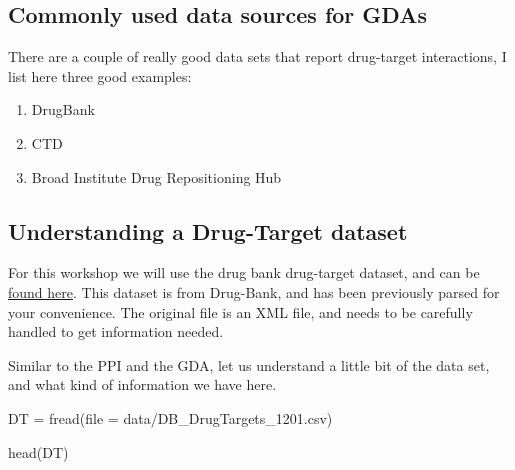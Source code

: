 \documentclass[
]{book}
\newenvironment{Shaded}{\begin{snugshade}}{\end{snugshade}}
\newcommand{\AttributeTok}[1]{\textcolor[rgb]{0.77,0.63,0.00}{#1}}
\newcommand{\FunctionTok}[1]{\textcolor[rgb]{0.00,0.00,0.00}{#1}}
\newcommand{\NormalTok}[1]{#1}
\newcommand{\OtherTok}[1]{\textcolor[rgb]{0.56,0.35,0.01}{#1}}
\newcommand{\StringTok}[1]{\textcolor[rgb]{0.31,0.60,0.02}{#1}}
\begin{document}
\hypertarget{commonly-used-data-sources-for-gdas-1}{%
\subsection{Commonly used data sources for GDAs}\label{commonly-used-data-sources-for-gdas-1}}

There are a couple of really good data sets that report drug-target interactions, I list here three good examples:

\begin{enumerate}
\def\labelenumi{\arabic{enumi}.}
\item
  DrugBank \citep{Wishart2006, wishart2017}
\item
  CTD \citep{davis2020}
\item
  Broad Institute Drug Repositioning Hub \citep{corsello2017}
\end{enumerate}

\hypertarget{understanding-a-drug-target-dataset}{%
\subsection{Understanding a Drug-Target dataset}\label{understanding-a-drug-target-dataset}}

For this workshop we will use the drug bank drug-target dataset, and can be \href{https://github.com/deisygysi/NetMed_Workshop/blob/master/data/DB_DrugTargets_1201.csv}{found here}. This dataset is from Drug-Bank, and has been previously parsed for your convenience. The original file is an XML file, and needs to be carefully handled to get information needed.

Similar to the PPI and the GDA, let us understand a little bit of the data set, and what kind of information we have here.

\begin{Shaded}
\begin{Highlighting}[]
\NormalTok{DT }\OtherTok{=} \FunctionTok{fread}\NormalTok{(}\AttributeTok{file =} \StringTok{\textquotesingle{}data/DB\_DrugTargets\_1201.csv\textquotesingle{}}\NormalTok{)}

\FunctionTok{head}\NormalTok{(DT)}
\end{Highlighting}
\end{Shaded}
\end{document}
